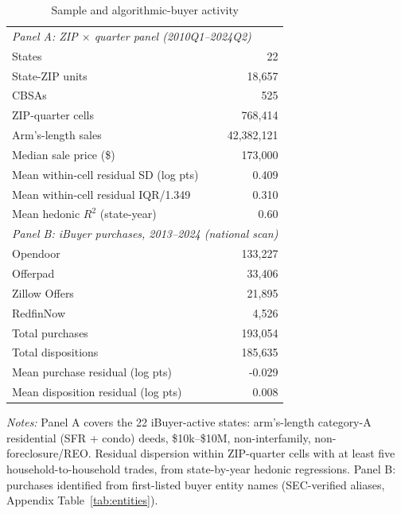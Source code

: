 \begin{table}[!htbp]\centering
\caption{Sample and algorithmic-buyer activity}
\label{tab:T1}
\begin{tabular}{lr}
\toprule
\multicolumn{2}{l}{\emph{Panel A: ZIP $\times$ quarter panel (2010Q1--2024Q2)}}\\
States & 22\\
State-ZIP units & 18,657\\
CBSAs & 525\\
ZIP-quarter cells & 768,414\\
Arm's-length sales & 42,382,121\\
Median sale price (\$) & 173,000\\
Mean within-cell residual SD (log pts) & 0.409\\
Mean within-cell residual IQR/1.349 & 0.310\\
Mean hedonic $R^2$ (state-year) & 0.60\\
\midrule
\multicolumn{2}{l}{\emph{Panel B: iBuyer purchases, 2013--2024 (national scan)}}\\
Opendoor & 133,227\\
Offerpad &  33,406\\
Zillow Offers &  21,895\\
RedfinNow &   4,526\\
Total purchases & 193,054\\
Total dispositions & 185,635\\
Mean purchase residual (log pts) & -0.029\\
Mean disposition residual (log pts) & 0.008\\
\bottomrule
\end{tabular}
\begin{minipage}{0.85\linewidth}\footnotesize\vspace{2pt}
\emph{Notes:} Panel A covers the 22 iBuyer-active states: arm's-length
category-A residential (SFR + condo) deeds, \$10k--\$10M, non-interfamily,
non-foreclosure/REO. Residual dispersion within ZIP-quarter cells with at
least five household-to-household trades, from state-by-year hedonic
regressions. Panel B: purchases identified from first-listed buyer entity
names (SEC-verified aliases, Appendix Table~\ref{tab:entities}).
\end{minipage}
\end{table}
